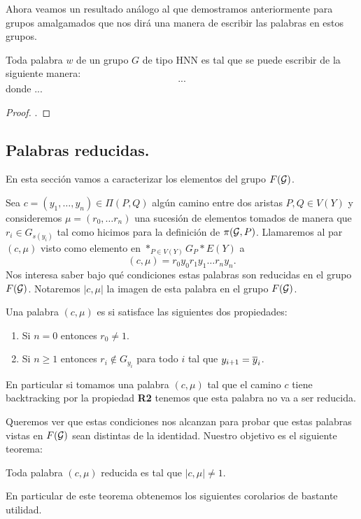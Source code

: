 \documentclass[tesis.tex]{subfiles}
\begin{document}
Ahora veamos un resultado análogo al que demostramos anteriormente para grupos amalgamados que nos dirá una manera de escribir las palabras en estos grupos.
\begin{teo}[Britton]
	Toda palabra $w$ de un grupo $G$ de tipo HNN es tal que se puede escribir de la siguiente manera:
	\[
	...
	\]
	donde ...
\end{teo}
\begin{proof}
	.
\end{proof}
\subsection{Palabras reducidas.}

En esta sección vamos a caracterizar los elementos del grupo $F({\cal G})$.

Sea $c=(y_1, \dots, y_n) \in \Pi(P,Q)$ algún camino entre dos aristas $P,Q \in V(Y)$ y consideremos $\mu = (r_0, \dots r_n)$ una sucesión de elementos tomados de manera que $r_i \in G_{s(y_i)}$ tal como hicimos para la definición de $\pi({\cal G}, P)$.
Llamaremos al par $(c, \mu)$ visto como elemento en $\ast_{P \in V(Y)}G_P \ast E(Y)$ a 
\[
(c,\mu) = r_0 y_0 r_1 y_1 \dots r_n y_n.
\]
Nos interesa saber bajo qué condiciones estas palabras son reducidas en el grupo $F({\cal G})$.
Notaremos $|c,\mu|$ la imagen de esta palabra en el grupo $F({\cal G})$.

\begin{deff}
	Una palabra $(c, \mu)$ es  si satisface las siguientes dos propiedades:
	\begin{enumerate}[R1.]
		\item Si $n=0$ entonces $r_0 \neq 1$.
		\item Si $n \ge 1$ entonces $r_i \notin G_{y_i}$ para todo $i$ tal que $y_{i+1} = \overline y_{i}$.
	\end{enumerate}
\end{deff}
En particular si tomamos una palabra $(c, \mu)$ tal que el camino $c$ tiene backtracking por la propiedad \textbf{R2} tenemos que esta palabra no va a ser reducida.

Queremos ver que estas condiciones nos alcanzan para probar que estas palabras vistas en $F({\cal G})$ sean distintas de la identidad.
Nuestro objetivo es el siguiente teorema:
\begin{teo}\label{teo_pal_red}
	Toda palabra $(c, \mu)$ reducida es tal que $|c,\mu| \neq 1$.
\end{teo}

En particular de este teorema obtenemos los siguientes corolarios de bastante utilidad.
\end{document}
